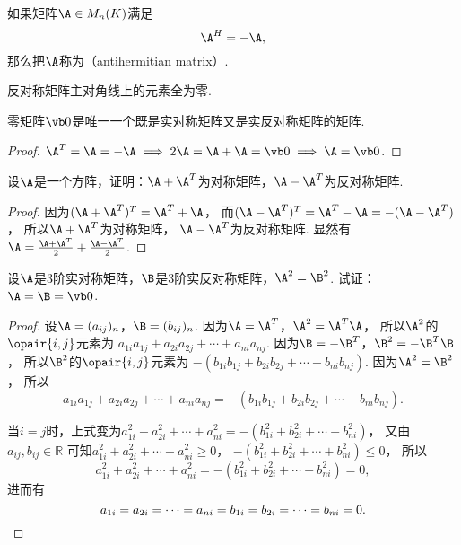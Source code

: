 \begin{definition}
如果矩阵\(\A \in M_n(K)\)满足\[
	\A^H = -\A,
\]
那么把\(\A\)称为（antihermitian matrix）.
\end{definition}

\begin{property}
反对称矩阵主对角线上的元素全为零.
\end{property}

\begin{example}
零矩阵\(\vb0\)是唯一一个既是实对称矩阵又是实反对称矩阵的矩阵.
\begin{proof}
\(\A^T = \A = -\A \implies 2\A = \A+\A = \vb0 \implies \A = \vb0\).
\end{proof}
\end{example}

\begin{example}
设\(\A\)是一个方阵，证明：\(\A+\A^T\)为对称矩阵，\(\A-\A^T\)为反对称矩阵.
\begin{proof}
因为\((\A+\A^T)^T = \A^T+\A\)，
而\((\A-\A^T)^T = \A^T - \A = -(\A-\A^T)\)，
所以\(\A+\A^T\)为对称矩阵，
\(\A-\A^T\)为反对称矩阵.
显然有\(\A = \frac{\A + \A^T}{2} + \frac{\A - \A^T}{2}\).
\end{proof}
\end{example}

\begin{example}
设\(\A\)是3阶实对称矩阵，\(\B\)是3阶实反对称矩阵，\(\A^2 = \B^2\).
试证：\(\A = \B = \vb0\).
\begin{proof}
设\(\A = (a_{ij})_n\)，\(\B = (b_{ij})_n\).
因为\(\A = \A^T\)，\(\A^2 = \A^T \A\)，
所以\(\A^2\)的\(\opair{i,j}\)元素为
\(a_{1i} a_{1j} + a_{2i} a_{2j} + \dotsb + a_{ni} a_{nj}\).
因为\(\B = -\B^T\)，\(\B^2 = -\B^T \B\)，
所以\(\B^2\)的\(\opair{i,j}\)元素为
\(-(b_{1i} b_{1j} + b_{2i} b_{2j} + \dotsb + b_{ni} b_{nj})\).
因为\(\A^2 = \B^2\)，
所以\[
	a_{1i} a_{1j} + a_{2i} a_{2j} + \dotsb + a_{ni} a_{nj}
	= -(b_{1i} b_{1j} + b_{2i} b_{2j} + \dotsb + b_{ni} b_{nj}).
\]

当\(i=j\)时，上式变为\(a_{1i}^2 + a_{2i}^2 + \dotsb + a_{ni}^2
= -(b_{1i}^2 + b_{2i}^2 + \dotsb + b_{ni}^2)\)，
又由\(a_{ij},b_{ij} \in \mathbb{R}\)
可知\(a_{1i}^2 + a_{2i}^2 + \dotsb + a_{ni}^2 \geq 0\)，
\(-(b_{1i}^2 + b_{2i}^2 + \dotsb + b_{ni}^2) \leq 0\)，
所以\[
	a_{1i}^2 + a_{2i}^2 + \dotsb + a_{ni}^2
	= -(b_{1i}^2 + b_{2i}^2 + \dotsb + b_{ni}^2) = 0,
\]
进而有\[
	a_{1i} = a_{2i} = \dotsb = a_{ni} = b_{1i} = b_{2i} = \dotsb = b_{ni} = 0.
	\qedhere
\]
\end{proof}
\end{example}

